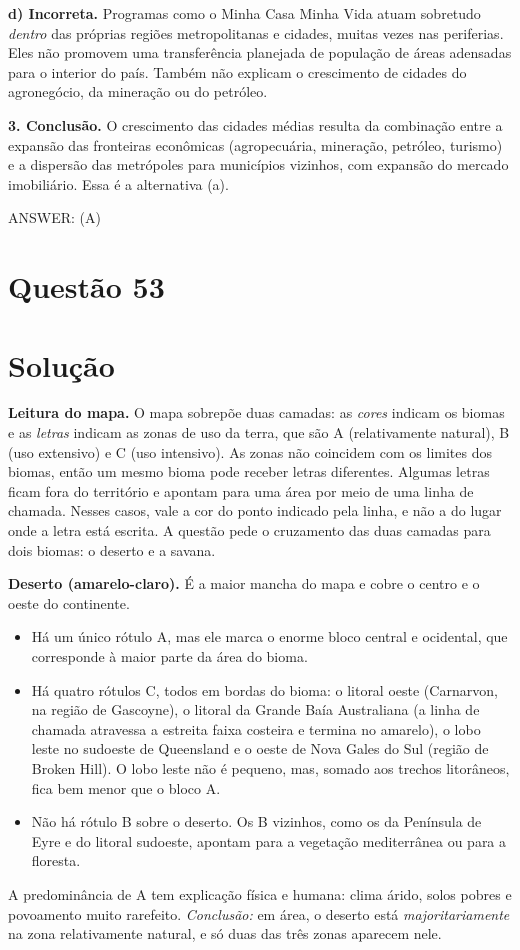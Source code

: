 \documentclass{article}%
\begin{document}
\textbf{d) Incorreta.} Programas como o Minha Casa Minha Vida atuam sobretudo \emph{dentro} das próprias regiões metropolitanas e cidades, muitas vezes nas periferias. Eles não promovem uma transferência planejada de população de áreas adensadas para o interior do país. Também não explicam o crescimento de cidades do agronegócio, da mineração ou do petróleo.

\textbf{3. Conclusão.} O crescimento das cidades médias resulta da combinação entre a expansão das fronteiras econômicas (agropecuária, mineração, petróleo, turismo) e a dispersão das metrópoles para municípios vizinhos, com expansão do mercado imobiliário. Essa é a alternativa (a).

ANSWER: (A)%
\newpage%
\section*{Questão 53}

\section*{Solução}

\textbf{Leitura do mapa.} O mapa sobrepõe duas camadas: as \emph{cores} indicam os biomas e as \emph{letras} indicam as zonas de uso da terra, que são A (relativamente natural), B (uso extensivo) e C (uso intensivo). As zonas não coincidem com os limites dos biomas, então um mesmo bioma pode receber letras diferentes. Algumas letras ficam fora do território e apontam para uma área por meio de uma linha de chamada. Nesses casos, vale a cor do ponto indicado pela linha, e não a do lugar onde a letra está escrita. A questão pede o cruzamento das duas camadas para dois biomas: o deserto e a savana.

\textbf{Deserto (amarelo-claro).} É a maior mancha do mapa e cobre o centro e o oeste do continente.
\begin{itemize}
\item Há um único rótulo A, mas ele marca o enorme bloco central e ocidental, que corresponde à maior parte da área do bioma.
\item Há quatro rótulos C, todos em bordas do bioma: o litoral oeste (Carnarvon, na região de Gascoyne), o litoral da Grande Baía Australiana (a linha de chamada atravessa a estreita faixa costeira e termina no amarelo), o lobo leste no sudoeste de Queensland e o oeste de Nova Gales do Sul (região de Broken Hill). O lobo leste não é pequeno, mas, somado aos trechos litorâneos, fica bem menor que o bloco A.
\item Não há rótulo B sobre o deserto. Os B vizinhos, como os da Península de Eyre e do litoral sudoeste, apontam para a vegetação mediterrânea ou para a floresta.
\end{itemize}
A predominância de A tem explicação física e humana: clima árido, solos pobres e povoamento muito rarefeito. \emph{Conclusão:} em área, o deserto está \emph{majoritariamente} na zona relativamente natural, e só duas das três zonas aparecem nele.
\end{document}
